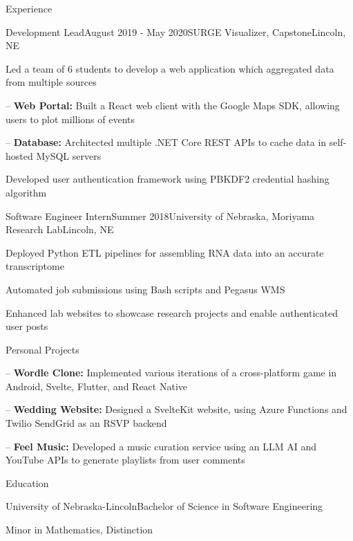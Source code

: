 \documentclass[
	10pt, %
]{article} %
\begin{document}
\begin{rSection}{Experience}
	\begin{rSubsection}{Development Lead}{August 2019 - May 2020}{SURGE Visualizer, Capstone}{Lincoln, NE}
		\item[] Led a team of 6 students to develop a web application which aggregated data from multiple sources
		\item[--] \textbf{Web Portal:} Built a React web client with the Google Maps SDK, allowing users to plot millions of events
		\item[--] \textbf{Database:} Architected multiple .NET Core REST APIs to cache data in self-hosted MySQL servers
		\item Developed user authentication framework using PBKDF2 credential hashing algorithm
	\end{rSubsection}

	\begin{rSubsection}{Software Engineer Intern}{Summer 2018}{University of Nebraska, Moriyama Research Lab}{Lincoln, NE}
		\item Deployed Python ETL pipelines for assembling RNA data into an accurate transcriptome
		\item Automated job submissions using Bash scripts and Pegasus WMS
		\item Enhanced lab websites to showcase research projects and enable authenticated user posts
	\end{rSubsection}

\end{rSection}

\begin{rSection}{Personal Projects}

	\begin{rSubsection}{}{}{}{}
		\item[--] \textbf{Wordle Clone:} Implemented various iterations of a cross-platform game in Android, Svelte, Flutter, and React Native
	\end{rSubsection}

	\begin{rSubsection}{}{}{}{}
		\item[--] \textbf{Wedding Website:} Designed a SvelteKit website, using Azure Functions and Twilio SendGrid as an RSVP backend
	\end{rSubsection}

	\begin{rSubsection}{}{}{}{}
		\item[--] \textbf{Feel Music:} Developed a music curation service using an LLM AI and YouTube APIs to generate playlists from user comments
	\end{rSubsection}

\end{rSection}

\begin{rSection}{Education}
	\begin{rSubsection}{University of Nebraska-Lincoln}{}{Bachelor of Science in Software Engineering}{}
		\item[] Minor in Mathematics, Distinction
	\end{rSubsection}
\end{rSection}
\end{document}
